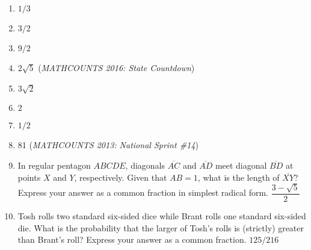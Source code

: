 \documentclass{article}
\begin{document}
\begin{enumerate}
\item $1/3$\vspace{1cm}
\item $3/2$\vspace{1cm}
\item $9/2$\vspace{1cm}
\item $2\sqrt{5}$ (\emph{MATHCOUNTS 2016: State Countdown}) \vspace{1cm}
\item $3\sqrt{2}$\vspace{1cm}
\item $2$\vspace{1cm}
\item $1/2$\vspace{1cm}
\item 81 (\emph{MATHCOUNTS 2013: National Sprint \#14}) \vspace{1cm}
\item In regular pentagon $ABCDE$, diagonals $\overline{AC}$ and $\overline{AD}$ meet diagonal $\overline{BD}$ at points $X$ and $Y$, respectively. Given that $AB = 1$, what is the length of $\overline{XY}$? Express your answer as a common fraction in simplest radical form. $\boxed{\dfrac{3 - \sqrt{5}}{2}}$
\vspace{1cm}
\item Tosh rolls two standard six-sided dice while Brant rolls one standard six-sided die. What is the probability that the larger of Tosh's rolls is (strictly) greater than Brant's roll? Express your answer as a common fraction. $\boxed{125/216}$
\end{enumerate}
\end{document}
